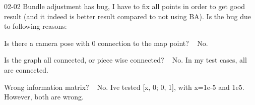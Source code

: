  02-\/02 Bundle adjustment has bug, I have to fix all points in order to get good result (and it indeed is better result compared to not using BA). Is the bug due to following reasons\+:
\begin{DoxyItemize}
\item Is there a camera pose with 0 connection to the map point? ~\newline
 No.
\item Is the graph all connected, or piece wise connected? ~\newline
 No. In my test cases, all are connected.
\item Wrong information matrix? ~\newline
 No. I\textquotesingle{}ve tested \mbox{[}x, 0; 0, 1\mbox{]}, with x=1e-\/5 and 1e5. However, both are wrong. 
\end{DoxyItemize}